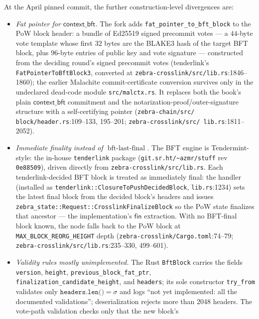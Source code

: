 \documentclass[11pt,a4paper]{article}
\theoremstyle{definition}
\begin{document}
At the April pinned commit, the further construction-level divergences are:
\begin{itemize}
\item \emph{Fat pointer for $\mathsf{context\_bft}$.} The fork adds
  \texttt{fat\_pointer\_to\_bft\_block} to the PoW block header: a bundle
  of Ed25519 signed precommit votes --- a $44$-byte vote template whose
  first $32$ bytes are the BLAKE3 hash of the target BFT block, plus
  $96$-byte entries of public key and vote signature --- constructed from
  the deciding round's signed precommit votes (tenderlink's
  \texttt{FatPointerToBftBlock3}, converted at
  \texttt{zebra-crosslink/src/lib.rs}:1846--1860); the earlier Malachite
  commit-certificate conversion survives only in the undeclared
  dead-code module \texttt{src/malctx.rs}. It replaces both the book's
  plain $\mathsf{context\_bft}$ commitment and the
  notarization-proof/outer-signature structure with a self-certifying
  pointer (\texttt{zebra-chain/\allowbreak src/\allowbreak
  block/\allowbreak header.rs}:109--133, 195--201;
  \texttt{zebra-crosslink/\allowbreak src/\allowbreak
  lib.rs}:1811--2052).
\item \emph{Immediate finality instead of
  $\operatorname{bft\text{-}last\text{-}final}$.} The BFT engine is
  Tendermint-style: the in-house \texttt{tenderlink} package
  (\texttt{git.sr.ht/\textasciitilde azmr/stuff} rev \texttt{0e88509}),
  driven directly from \texttt{zebra-crosslink/src/lib.rs}. Each
  tenderlink-decided BFT block is treated as immediately final: the
  handler (installed as \texttt{tenderlink::ClosureToPushDecidedBlock},
  \texttt{lib.rs}:1234) sets the latest final block from the
  decided block's headers and issues
  \texttt{zebra\_state::Request::CrosslinkFinalizeBlock} so the PoW state
  finalizes that ancestor --- the implementation's $\mathsf{fin}$
  extraction. With no BFT-final block known, the node falls back to the
  PoW block at \texttt{MAX\_BLOCK\_REORG\_HEIGHT} depth
  (\texttt{zebra-crosslink/Cargo.toml}:74--79;
  \texttt{zebra-crosslink/src/lib.rs}:235--330, 499--601).
\item \emph{Validity rules mostly unimplemented.} The Rust
  \texttt{BftBlock} carries the fields \texttt{version},
  \texttt{height}, \texttt{previous\_block\_fat\_ptr},
  \texttt{finalization\_candidate\_height}, and \texttt{headers}; its
  sole constructor \texttt{try\_from} validates only
  $\texttt{headers.len()} = \sigma$ and logs ``not yet implemented: all
  the documented validations''; deserialization rejects more than $2048$
  headers. The vote-path validation checks only that the new block's

\end{itemize}
\end{document}
